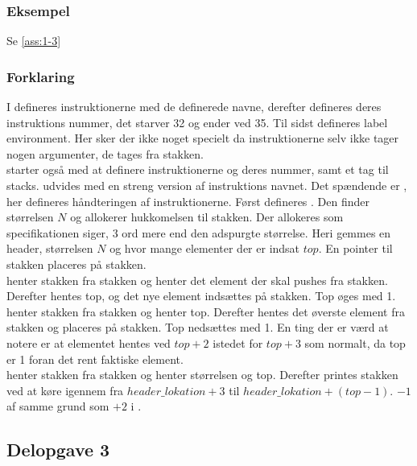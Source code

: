 \subsubsection{Eksempel}
Se \ref{ass:1-3}

\subsubsection{Forklaring}
I  defineres instruktionerne med de definerede navne, derefter defineres deres instruktions nummer, det starver 32 og ender ved 35. Til sidst defineres label environment. Her sker der ikke noget specielt da instruktionerne selv ikke tager nogen argumenter, de tages fra stakken.\\[1ex]

 starter også med at definere instruktionerne og deres nummer, samt et tag til stacks.  udvides med en streng version af instruktions navnet. Det spændende er , her defineres håndteringen af instruktionerne. Først defineres . Den finder størrelsen $N$ og allokerer hukkomelsen til stakken. Der allokeres som specifikationen siger, 3 ord mere end den adspurgte størrelse. Heri gemmes en header, størrelsen $N$ og hvor mange elementer der er indsat $top$. En pointer til stakken placeres på stakken.\\

 henter stakken fra stakken og henter det element der skal pushes fra stakken. Derefter hentes top, og det nye element indsættes på stakken. Top øges med 1.\\

 henter stakken fra stakken og henter top. Derefter hentes det øverste element fra stakken og placeres på stakken. Top nedsættes med 1. En ting der er værd at notere er at elementet hentes ved $top+2$ istedet for $top+3$ som normalt, da top er 1 foran det rent faktiske element.\\

 henter stakken fra stakken og henter størrelsen og top. Derefter printes stakken ved at køre igennem fra $header\_lokation+3$ til $header\_lokation + (top-1)$. $-1$ af samme grund som $+2$ i .



\subsection{Delopgave 3}\label{ass:2-3}
